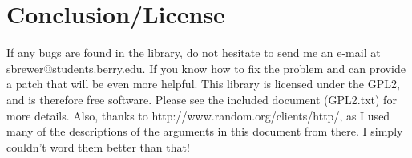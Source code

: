 \documentclass[12 pt]{report}
\begin{document}
\chapter{Conclusion/License}

If any bugs are found in the library, do not hesitate to send me an e-mail
at sbrewer@students.berry.edu. If you know how to fix the problem and 
can provide a patch that will be even more helpful. This library is licensed 
under the GPL2, and is therefore free software. Please see the included document (GPL2.txt) 
for more details. Also, thanks to http://www.random.org/clients/http/, as I used many of the descriptions
of the arguments in this document from there. I simply couldn't word them better than that!
\end{document}
